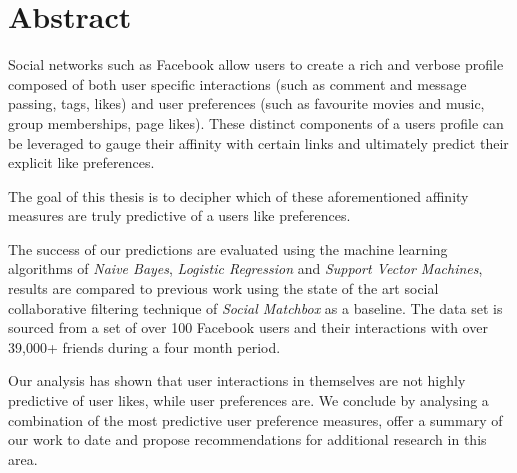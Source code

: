 
\chapter*{Abstract}
\label{cha:abstract}

Social networks such as Facebook allow users to create a rich and verbose profile composed of both user specific interactions (such as 
comment and message passing, tags, likes) and user preferences (such as favourite movies and music, group memberships, page likes). 
These distinct components of a users profile can be leveraged to gauge their affinity with certain links and ultimately predict their
explicit like preferences.

The goal of this thesis is to decipher which of these aforementioned affinity measures are truly predictive of a users like preferences.

The success of our predictions are evaluated using the machine learning algorithms of  
\emph{Naive Bayes}, \emph{Logistic Regression} and \emph{Support Vector Machines}, results are compared to previous 
work using the state of the art social collaborative filtering technique of \emph{Social Matchbox} as a baseline. 
The data set is sourced from a set of over 100 Facebook users and their interactions with over 39,000+ friends during a four month period.

Our analysis has shown that user interactions in themselves are not highly predictive of user likes, while user preferences are. We conclude 
by analysing a combination of the most predictive user preference measures, offer a summary of our work to date and propose recommendations
for additional research in this area.


